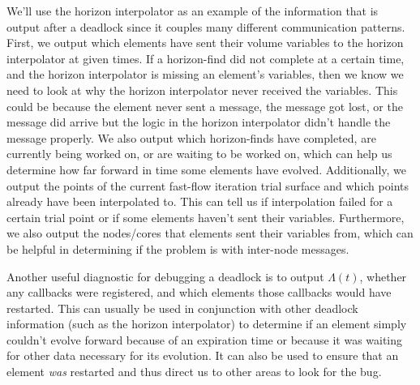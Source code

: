 \begin{bibunit}[unsrtnat]
We'll use the horizon interpolator as an example of the information that is
output after a deadlock since it couples many different communication patterns.
First, we output which elements have sent their volume variables to the horizon
interpolator at given times. If a horizon-find did not complete at a certain
time, and the horizon interpolator is missing an element's variables, then we
know we need to look at why the horizon interpolator never received the
variables. This could be because the element never sent a message, the message
got lost, or the message did arrive but the logic in the horizon interpolator
didn't handle the message properly. We also output which horizon-finds have
completed, are currently being worked on, or are waiting to be worked on, which
can help us determine how far forward in time some elements have evolved.
Additionally, we output the points of the current fast-flow iteration trial
surface and which points already have been interpolated to. This can tell us if
interpolation failed for a certain trial point or if some elements haven't sent
their variables. Furthermore, we also output the nodes/cores that elements sent
their variables from, which can be helpful in determining if the problem is with
inter-node messages.

Another useful diagnostic for debugging a deadlock is to output $\Lambda(t)$,
whether any callbacks were registered, and which elements
those callbacks would have restarted. This can usually be used in
conjunction with other deadlock information (such as the horizon interpolator)
to determine if an element simply couldn't evolve forward because of an
expiration time or because it was waiting for other data necessary for its
evolution. It can also be used to ensure that an element \textit{was} restarted
and thus direct us to other areas to look for the bug.


\end{bibunit}
